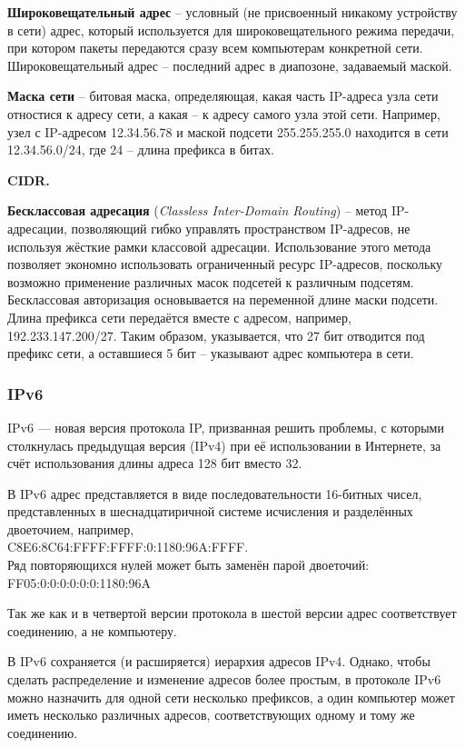 \documentclass[a4paper]{article}
\begin{document}
		\textbf{Широковещательный адрес} -- условный (не присвоенный никакому устройству в сети) адрес, который используется для широковещательного режима передачи, при котором пакеты передаются сразу всем компьютерам конкретной сети. Широковещательный адрес -- последний адрес в диапозоне, задаваемый маской.

		\textbf{Маска сети} -- битовая маска, определяющая, какая часть IP-адреса узла сети отностися к адресу сети, а какая -- к адресу самого узла этой сети. Например, узел с IP-адресом 12.34.56.78 и маской подсети 255.255.255.0 находится в сети 12.34.56.0/24, где 24 -- длина префикса в битах.

		\textbf{CIDR.}

		\textbf{Бесклассовая адресация} (\emph{Classless Inter-Domain Routing}) -- метод IP-адресации, позволяющий гибко управлять пространством IP-адресов, не используя жёсткие рамки классовой адресации. Использование этого метода позволяет экономно использовать ограниченный ресурс IP-адресов, поскольку возможно применение различных масок подсетей к различным подсетям. Бесклассовая авторизация основывается на переменной длине маски подсети. Длина префикса сети передаётся вместе с адресом, например, 192.233.147.200/27. Таким образом, указывается, что 27 бит отводится под префикс сети, а оставшиеся 5 бит -- указывают адрес компьютера в сети.
		
	\subsubsection{IPv6}
		IPv6 — новая версия протокола IP, призванная решить проблемы, с которыми столкнулась предыдущая версия (IPv4) при её использовании в Интернете, за счёт использования длины адреса 128 бит вместо 32.
		
		В IPv6 адрес представляется в виде последовательности 16-битных чисел, представленных в шеснадцатиричной системе исчисления и разделённых двоеточием, например,\\ C8E6:8C64:FFFF:FFFF:0:1180:96A:FFFF.\\
		Ряд повторяющихся нулей может быть заменён парой двоеточий:\\
		FF05:0:0:0:0:0:0:1180:96A
		
		Так же как и в четвертой версии протокола в шестой версии адрес соответствует соединению, а не компьютеру.
		
		В IPv6 сохраняется (и расширяется) иерархия адресов IPv4. Однако, чтобы сделать распределение и изменение адресов более простым, в протоколе IPv6 можно назначить для одной сети несколько префиксов, а один компьютер может иметь несколько различных адресов, соответствующих одному и тому же соединению.
		
\end{document}
